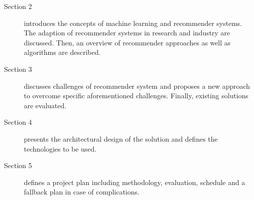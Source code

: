 \begin{description}
    \item[Section 2] introduces the concepts of machine learning and recommender systems. The adaption of recommender systems in research and industry are discussed. Then, an overview of recommender approaches as well as algorithms are described.
    \item[Section 3] discusses challenges of recommender system and proposes a new approach to overcome specific aforementioned challenges. Finally, existing solutions are evaluated.
    \item[Section 4] presents the architectural design of the solution and defines the technologies to be used.
    \item[Section 5] defines a project plan including methodology, evaluation, schedule and a fallback plan in case of complications.
\end{description}